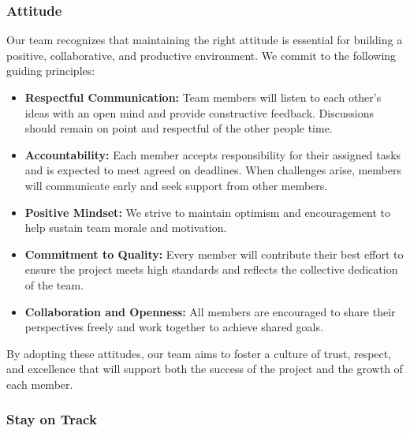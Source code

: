 \documentclass{article}
\begin{document}
\subsubsection*{Attitude}
Our team recognizes that maintaining the right attitude is essential for
building a positive, collaborative, and productive environment. We commit to
the following guiding principles:

\begin{itemize}
    \item \textbf{Respectful Communication:} Team members will listen to each
    other’s ideas with an open mind and provide constructive feedback.
    Discussions should remain on point and respectful of the other people time.

    \item \textbf{Accountability:} Each member accepts responsibility for their
    assigned tasks and is expected to meet agreed on deadlines. When
    challenges arise, members will communicate early and seek support from other members.

    \item \textbf{Positive Mindset:} We strive to maintain optimism and
    encouragement to help sustain team morale and motivation.

    \item \textbf{Commitment to Quality:} Every member will contribute their
    best effort to ensure the project meets high standards and reflects the
    collective dedication of the team.

    \item \textbf{Collaboration and Openness:} All members are encouraged to
    share their perspectives freely and work together to achieve shared goals.
\end{itemize}

By adopting these attitudes, our team aims to foster a culture of trust,
respect, and excellence that will support both the success of the project and
the growth of each member.

\iffalse
\wss{What are your team's expectations regarding team members' ideas,
interactions with the team, cooperation, attitudes, and anything else regarding
team member contributions?  Do you want to introduce a code of conduct?  Do you
want a conflict resolution plan?  Can adopt existing codes of conduct.}
\fi

\subsubsection*{Stay on Track}
\end{document}
